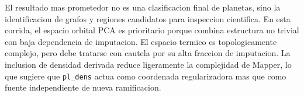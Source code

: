 El resultado mas prometedor no es una clasificacion final de planetas, sino la identificacion de grafos y regiones candidatos para inspeccion cientifica. En esta corrida, el espacio orbital PCA es prioritario porque combina estructura no trivial con baja dependencia de imputacion. El espacio termico es topologicamente complejo, pero debe tratarse con cautela por su alta fraccion de imputacion. La inclusion de densidad derivada reduce ligeramente la complejidad de Mapper, lo que sugiere que \texttt{pl\_dens} actua como coordenada regularizadora mas que como fuente independiente de nueva ramificacion.
